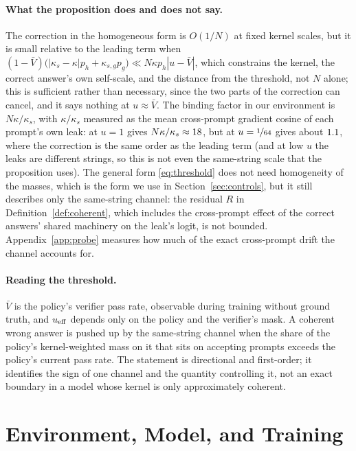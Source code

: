 \paragraph{What the proposition does and does not say.} The correction in the homogeneous form is $O(1/N)$ at fixed kernel scales, but it is small relative to the leading term when $(1-\bar V)\big(|\kappa_s-\kappa|p_h+\kappa_{s,g}p_g\big)\ll N\kappa p_h|u-\bar V|$, which constrains the kernel, the correct answer's own self-scale, and the distance from the threshold, not $N$ alone; this is sufficient rather than necessary, since the two parts of the correction can cancel, and it says nothing at $u\approx\bar V$. The binding factor in our environment is $N\kappa/\kappa_s$, with $\kappa/\kappa_s$ measured as the mean cross-prompt gradient cosine of each prompt's own leak: \CohHackHiFine{} at $u=1$ gives $N\kappa/\kappa_s\approx18{}$, but \CohHackLoFine{} at $u=\nicefrac{1}{64}$ gives about $1.1{}$, where the correction is the same order as the leading term (and at low $u$ the leaks are different strings, so this is not even the same-string scale that the proposition uses). The general form \eqref{eq:threshold} does not need homogeneity of the masses, which is the form we use in Section~\ref{sec:controls}, but it still describes only the same-string channel: the residual $R$ in Definition~\ref{def:coherent}, which includes the cross-prompt effect of the correct answers' shared machinery on the leak's logit, is not bounded. Appendix~\ref{app:probe} measures how much of the exact cross-prompt drift the channel accounts for.

\paragraph{Reading the threshold.} $\bar V$ is the policy's verifier pass rate, observable during training without ground truth, and $u_{\mathrm{eff}}$ depends only on the policy and the verifier's mask. A coherent wrong answer is pushed up by the same-string channel when the share of the policy's kernel-weighted mass on it that sits on accepting prompts exceeds the policy's current pass rate. The statement is directional and first-order; it identifies the sign of one channel and the quantity controlling it, not an exact boundary in a model whose kernel is only approximately coherent.

\section{Environment, Model, and Training}
\label{app:details}

